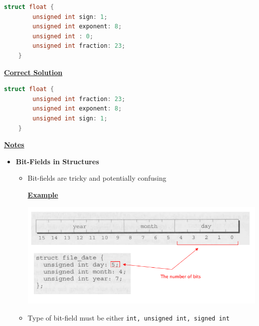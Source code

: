 \documentclass[12pt]{article}
\begin{document}
\begin{enumerate}[1.]
\begin{lstlisting}[language=c]
    struct float {
        unsigned int sign: 1;
        unsigned int exponent: 8;
        unsigned int : 0;
        unsigned int fraction: 23;
    }
\end{lstlisting}

    \bigskip

    \begin{mdframed}
    \underline{\textbf{Correct Solution}}

    \bigskip

\begin{lstlisting}[language=c]
    struct float {
        unsigned int fraction: 23;
        unsigned int exponent: 8;
        unsigned int sign: 1;
    }
\end{lstlisting}


    \end{mdframed}

    \bigskip

    \underline{\textbf{Notes}}

    \begin{itemize}
        \item \textbf{Bit-Fields in Structures}

        \begin{itemize}
            \item Bit-fields are tricky and potentially confusing

            \bigskip

            \underline{\textbf{Example}}

            \bigskip

            \begin{center}
            \includegraphics[width=0.9\linewidth]{images/review_9_solution_8.png}
            \end{center}

            \item Type of bit-field must be either \texttt{int, unsigned int, signed int}


\end{itemize}
\end{itemize}
\end{enumerate}
\end{document}
